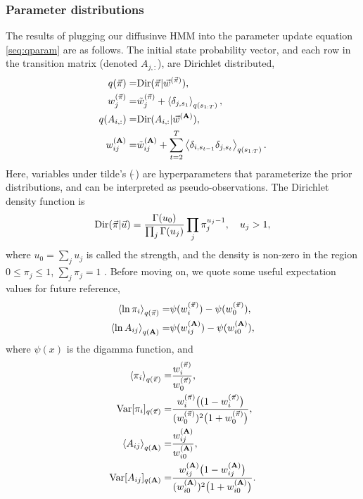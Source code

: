 \subsubsection{Parameter distributions}
The results of plugging our diffusinve HMM into the parameter update
equation \eqref{seq:qparam} are as follows.  The initial state
probability vector, and each row in the transition matrix (denoted
$A_{j,:}$), are Dirichlet distributed,
\begin{align}
q(\vec{\pi})=&\text{Dir}(\vec{\pi}|\vec{w}^{(\vec{\pi})}),\\
w_j^{(\vec{\pi})}=&\tilde w_j^{(\vec{\pi})}+\left\langle \delta_{j,s_1}\right\rangle_{q(s_{1:T})},
\label{seq:VBMpi}\\
q(A_{i,:})=&\text{Dir}(A_{i,:}|\vec{w}^{(\mathbf{A})}),\\
w_{ij}^{(\mathbf{A})}=&\tilde w_{ij}^{(\mathbf{A})}
+\sum_{t=2}^T\left\langle \delta_{i,s_{t-1}}\delta_{j,s_t}\right\rangle_{q(s_{1:T})}.\label{seq:VBMAj}
\end{align}
Here, variables under tilde's ($\tilde{~}$) are hyperparameters that
parameterize the prior distributions, and can be interpreted as
pseudo-observations. The Dirichlet density function is
\begin{equation}
  \text{Dir}(\vec \pi | \vec u)=\frac{\Gamma(u_0)}{\prod_j\Gamma(u_j)}
  \prod_j \pi_j^{u_j-1},\quad u_j>1,
\end{equation}
where $u_0=\sum_j u_j$ is called the strength, and the density is
non-zero in the region $0\le\pi_j\le1$, $\sum_j\pi_j=1$ . Before
moving on, we quote some useful expectation values for future
reference,
\begin{align}
  \left\langle \ln\pi_i\right\rangle_{q(\vec{\pi})}=&\psi(w_i^{(\vec{\pi})})-\psi(w_0^{(\vec{\pi})}),
  \label{seq:mlogpi}\\
  \left\langle \ln A_{ij}\right\rangle_{q(\mathbf{A})}=&\psi(w_{ij}^{(\mathbf{A})})
  -\psi(w_{i0}^{(\mathbf{A})}),\label{seq:mlogA}
\end{align}
where $\psi(x)$ is the digamma function, and
\begin{align}
  \left\langle \pi_i\right\rangle_{q(\vec{\pi})}=&\frac{w_i^{(\vec{\pi})}}{w_0^{(\vec{\pi})}},\\
  \text{Var}[\pi_i]_{q(\vec{\pi})}=&
  \frac{w_i^{(\vec{\pi})}\big((1-w_i^{(\vec{\pi})}\big)}{
    (w_0^{(\vec{\pi})})^2\big(1+w_0^{(\vec{\pi})}\big)},\\
  \left\langle A_{ij}\right\rangle_{q(\mathbf{A})}=&\frac{w_{ij}^{(\mathbf{A})}}{w_{i0}^{(\mathbf{A})}},\\
  \text{Var}[A_{ij}]_{q(\mathbf{A})}=&
  \frac{w_{ij}^{(\mathbf{A})}\big(1-w_{ij}^{(\mathbf{A})}\big)}{
    (w_{i0}^{(\mathbf{A})})^2\big(1+w_{i0}^{(\mathbf{A})}\big)}.
\end{align}
